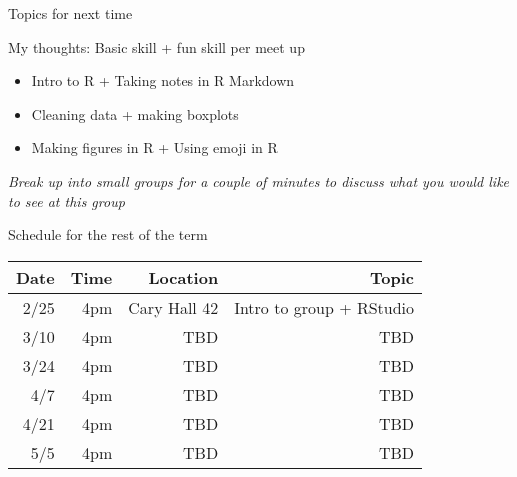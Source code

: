 \documentclass[
  ignorenonframetext,
]{beamer}
\providecommand{\tightlist}{%
  \setlength{\itemsep}{0pt}\setlength{\parskip}{0pt}}
\begin{document}
\begin{frame}{Topics for next time}
\protect\hypertarget{topics-for-next-time}{}

My thoughts: { Basic skill } + { fun skill } per meet up

\begin{itemize}
\tightlist
\item
  { Intro to R } + { Taking notes in R Markdown }
\item
  { Cleaning data } + { making boxplots }
\item
  { Making figures in R } + { Using emoji in R }
\end{itemize}

\emph{Break up into small groups for a couple of minutes to discuss what
you would like to see at this group}

\end{frame}

\begin{frame}{Schedule for the rest of the term}
\protect\hypertarget{schedule-for-the-rest-of-the-term}{}

\begin{longtable}[]{@{}rrrr@{}}
\toprule
Date & Time & Location & Topic\tabularnewline
\midrule
\endhead
2/25 & 4pm & Cary Hall 42 & Intro to group + RStudio\tabularnewline
3/10 & 4pm & TBD & TBD\tabularnewline
3/24 & 4pm & TBD & TBD\tabularnewline
4/7 & 4pm & TBD & TBD\tabularnewline
4/21 & 4pm & TBD & TBD\tabularnewline
5/5 & 4pm & TBD & TBD\tabularnewline
\bottomrule
\end{longtable}

\end{frame}
\end{document}
